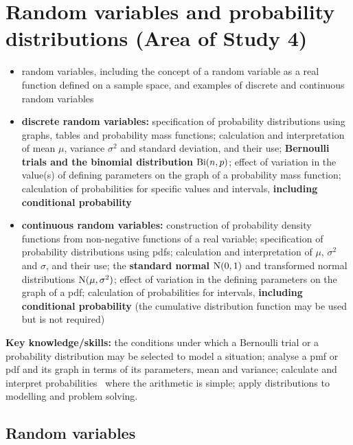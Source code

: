 \section{Random variables and probability distributions (Area of Study 4)}
\label{sec:rv}

\begin{sdbox}
\begin{itemize}
  \item random variables, including the concept of a random variable as a real function defined on a sample space, and examples of discrete and continuous random variables
  \item \textbf{discrete random variables:} specification of probability distributions using graphs, tables and probability mass functions; calculation and interpretation of mean $\mu$, variance $\sigma^2$ and standard deviation, and their use; \textbf{Bernoulli trials and the binomial distribution} $\mathrm{Bi}(n,p)$; effect of variation in the value(s) of defining parameters on the graph of a probability mass function; calculation of probabilities for specific values and intervals, \textbf{including conditional probability}
  \item \textbf{continuous random variables:} construction of probability density functions from non-negative functions of a real variable; specification of probability distributions using pdfs; calculation and interpretation of $\mu$, $\sigma^2$ and $\sigma$, and their use; the \textbf{standard normal} $\mathrm{N}(0,1)$ and transformed normal distributions $\mathrm{N}(\mu,\sigma^2)$; effect of variation in the defining parameters on the graph of a pdf; calculation of probabilities for intervals, \textbf{including conditional probability} (the cumulative distribution function may be used but is not required)
\end{itemize}
\textbf{Key knowledge/skills:} the conditions under which a Bernoulli trial or a probability distribution may be selected to model a situation; analyse a pmf or pdf and its graph in terms of its parameters, mean and variance; calculate and interpret probabilities \byhand\ where the arithmetic is simple; apply distributions to modelling and problem solving.
\end{sdbox}

\subsection{Random variables}
\label{sec:rvdef}

